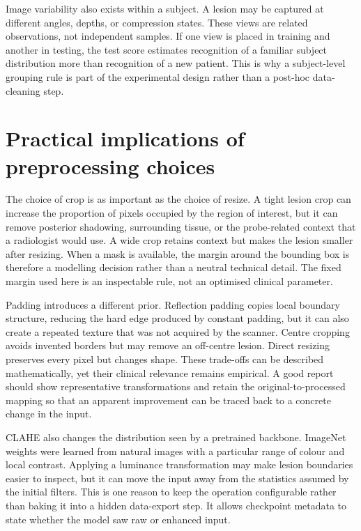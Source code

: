Image variability also exists within a subject. A lesion may be captured at different angles, depths, or compression states. These views are related observations, not independent samples. If one view is placed in training and another in testing, the test score estimates recognition of a familiar subject distribution more than recognition of a new patient. This is why a subject-level grouping rule is part of the experimental design rather than a post-hoc data-cleaning step.

\section{Practical implications of preprocessing choices}
The choice of crop is as important as the choice of resize. A tight lesion crop can increase the proportion of pixels occupied by the region of interest, but it can remove posterior shadowing, surrounding tissue, or the probe-related context that a radiologist would use. A wide crop retains context but makes the lesion smaller after resizing. When a mask is available, the margin around the bounding box is therefore a modelling decision rather than a neutral technical detail. The fixed margin used here is an inspectable rule, not an optimised clinical parameter.

Padding introduces a different prior. Reflection padding copies local boundary structure, reducing the hard edge produced by constant padding, but it can also create a repeated texture that was not acquired by the scanner. Centre cropping avoids invented borders but may remove an off-centre lesion. Direct resizing preserves every pixel but changes shape. These trade-offs can be described mathematically, yet their clinical relevance remains empirical. A good report should show representative transformations and retain the original-to-processed mapping so that an apparent improvement can be traced back to a concrete change in the input.

CLAHE also changes the distribution seen by a pretrained backbone. ImageNet weights were learned from natural images with a particular range of colour and local contrast. Applying a luminance transformation may make lesion boundaries easier to inspect, but it can move the input away from the statistics assumed by the initial filters. This is one reason to keep the operation configurable rather than baking it into a hidden data-export step. It allows checkpoint metadata to state whether the model saw raw or enhanced input.

